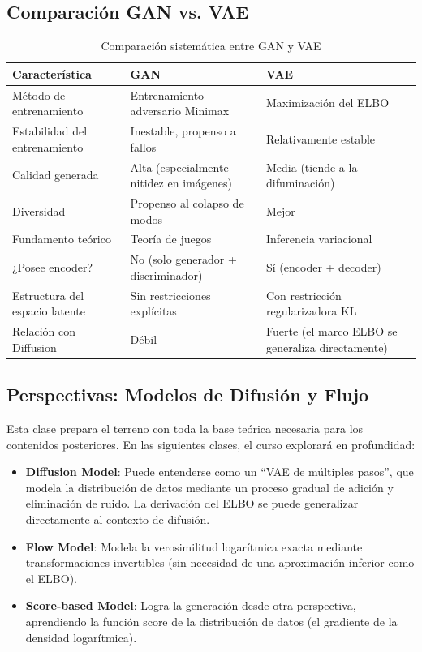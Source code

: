 \documentclass[a4paper]{article}
\begin{document}
\subsection{Comparación GAN vs. VAE}

\begin{table}[H]
\centering
\begin{tabular}{lll}
\toprule
Característica & GAN & VAE \\
\midrule
Método de entrenamiento & Entrenamiento adversario Minimax & Maximización del ELBO \\
Estabilidad del entrenamiento & Inestable, propenso a fallos & Relativamente estable \\
Calidad generada & Alta (especialmente nitidez en imágenes) & Media (tiende a la difuminación) \\
Diversidad & Propenso al colapso de modos & Mejor \\
Fundamento teórico & Teoría de juegos & Inferencia variacional \\
¿Posee encoder? & No (solo generador + discriminador) & Sí (encoder + decoder) \\
Estructura del espacio latente & Sin restricciones explícitas & Con restricción regularizadora KL \\
Relación con Diffusion & Débil & Fuerte (el marco ELBO se generaliza directamente) \\
\bottomrule
\end{tabular}
\caption{Comparación sistemática entre GAN y VAE}
\end{table}

\subsection{Perspectivas: Modelos de Difusión y Flujo}

Esta clase prepara el terreno con toda la base teórica necesaria para los contenidos posteriores. En las siguientes clases, el curso explorará en profundidad:

\begin{itemize}
    \item \textbf{Diffusion Model}: Puede entenderse como un ``VAE de múltiples pasos'', que modela la distribución de datos mediante un proceso gradual de adición y eliminación de ruido. La derivación del ELBO se puede generalizar directamente al contexto de difusión.
    \item \textbf{Flow Model}: Modela la verosimilitud logarítmica exacta mediante transformaciones invertibles (sin necesidad de una aproximación inferior como el ELBO).
    \item \textbf{Score-based Model}: Logra la generación desde otra perspectiva, aprendiendo la función score de la distribución de datos (el gradiente de la densidad logarítmica).
\end{itemize}
\end{document}
